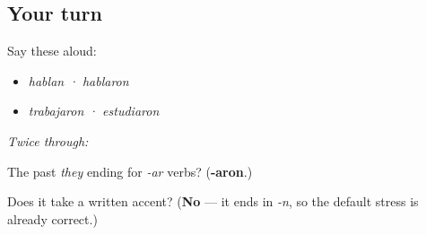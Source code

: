 \subsection*{Your turn}
Say these aloud:

\begin{itemize}
\raggedright
  \item \emph{hablan · hablaron}
  \item \emph{trabajaron · estudiaron}
\end{itemize}

\emph{Twice through:}

\begin{tcolorbox}[breakable,colback=teal!4,colframe=teal!35!black,title={Before you move on}]
The past \emph{they} ending for \emph{-ar} verbs? (\textbf{-aron}.)

Does it take a written accent? (\textbf{No} — it ends in \emph{-n}, so the default stress is already correct.)
\end{tcolorbox}
